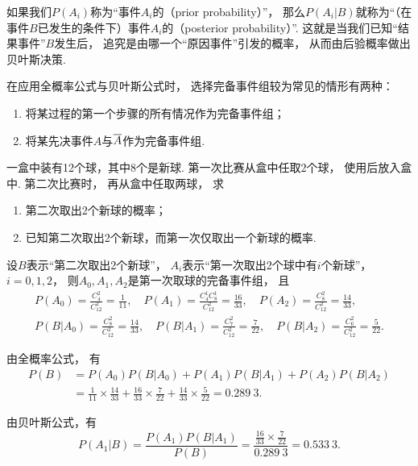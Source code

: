 如果我们\(P(A_i)\)称为“事件\(A_i\)的（prior probability）”，
那么\(P(A_i \vert B)\)就称为“（在事件\(B\)已发生的条件下）事件\(A_i\)的（posterior probability）”.
这就是当我们已知“结果事件”\(B\)发生后，
追究是由哪一个“原因事件”引发的概率，
从而由后验概率做出贝叶斯决策.

在应用全概率公式与贝叶斯公式时，
选择完备事件组较为常见的情形有两种：
\begin{enumerate}
	\item 将某过程的第一个步骤的所有情况作为完备事件组；

	\item 将某先决事件\(A\)与\(\SetComplementaryL{A}\)作为完备事件组.
\end{enumerate}

\begin{example}
一盒中装有12个球，其中8个是新球.
第一次比赛从盒中任取2个球，
使用后放入盒中.
第二次比赛时，
再从盒中任取两球，
求\begin{enumerate}
	\item 第二次取出2个新球的概率；
	\item 已知第二次取出2个新球，而第一次仅取出一个新球的概率.
\end{enumerate}
\begin{solution}
设\(B\)表示“第二次取出2个新球”，
\(A_i\)表示“第一次取出2个球中有\(i\)个新球”，
\(i=0,1,2\)，
则\(A_0,A_1,A_2\)是第一次取球的完备事件组，
且\begin{gather*}
	P(A_0) = \frac{C_4^2}{C_{12}^2} = \frac{1}{11},
	\quad
	P(A_1) = \frac{C_4^1 C_8^1}{C_{12}^2} = \frac{16}{33},
	\quad
	P(A_2) = \frac{C_8^2}{C_{12}^2} = \frac{14}{33}, \\
	P(B \vert A_0) = \frac{C_8^2}{C_{12}^2} = \frac{14}{33},
	\quad
	P(B \vert A_1) = \frac{C_7^2}{C_{12}^2} = \frac{7}{22},
	\quad
	P(B \vert A_2) = \frac{C_6^2}{C_{12}^2} = \frac{5}{22}.
\end{gather*}

由全概率公式，
有\begin{align*}
	P(B) &= P(A_0) P(B \vert A_0)
		+ P(A_1) P(B \vert A_1)
		+ P(A_2) P(B \vert A_2) \\
	&= \frac{1}{11} \times \frac{14}{33}
		+ \frac{16}{33} \times \frac{7}{22}
		+ \frac{14}{33} \times \frac{5}{22}
	= 0.289~3.
\end{align*}

由贝叶斯公式，有\begin{equation*}
	P(A_1 \vert B) = \frac{P(A_1) P(B \vert A_1)}{P(B)}
	= \frac{\frac{16}{33} \times \frac{7}{22}}{0.289~3}
	= 0.533~3.
\end{equation*}
\end{solution}
\end{example}
